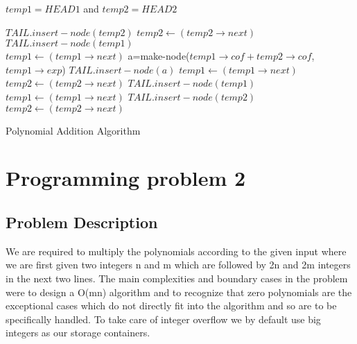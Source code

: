 \documentclass[20pt]{article}
\begin{document}
\newcommand\mycommfont[1]{\small\ttfamily\textcolor{blue}{#1}}

\begin{algorithm}


	
	$temp1 = HEAD1$ and $temp2 = HEAD2$ \\

	 {
		 {
			$TAIL.insert-node(temp2)$  
			$temp2 \leftarrow (temp2 \rightarrow next)$
		} {    {
					$TAIL.insert-node(temp1)$ \\
					$temp1 \leftarrow (temp1 \rightarrow next)$
				} {
					 {
							 {
									a=make-node($temp1 \rightarrow cof + temp2 \rightarrow cof$,$temp1 \rightarrow exp$)
									$TAIL.insert-node(a)$
							} { } 
							$temp1 \leftarrow (temp1 \rightarrow next)$ \\
							$temp2 \leftarrow (temp2 \rightarrow next)$
					} {
							 {
								$TAIL.insert-node(temp1)$ \\	
								$temp1 \leftarrow (temp1 \rightarrow next)$
							} {
								$TAIL.insert-node(temp2)$ \\
								$temp2 \leftarrow (temp2 \rightarrow next)$	
							}	
					}
				}
		}
	}
	\KwRet{}
	\caption{Polynomial Addition Algorithm}	

\end{algorithm}

\newpage
\section{Programming problem 2}

\subsection{Problem Description}
We are required to multiply the polynomials according to the given input where we are first given two integers n and m which are followed by {2n} and {2m} integers in the next two lines.
The main complexities and boundary cases in the problem were to design a {O(mn)} algorithm and to recognize that zero polynomials are the exceptional cases which do not directly fit into the algorithm and so are to be specifically handled. To take care of integer overflow we by default use big integers as our storage containers.
\end{document}
